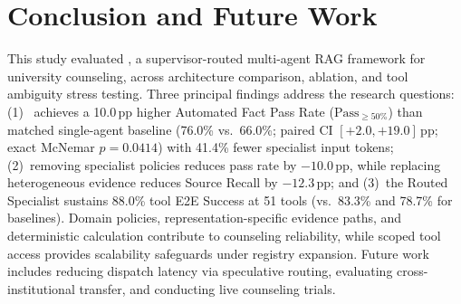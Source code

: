 \section{Conclusion and Future Work}
\label{sec:conclusion}

This study evaluated \system{}, a supervisor-routed multi-agent RAG framework for university counseling, across architecture comparison, ablation, and tool ambiguity stress testing. Three principal findings address the research questions: (1)~\system{} achieves a 10.0\,pp higher Automated Fact Pass Rate ($\text{Pass}_{\ge 50\%}$) than matched single-agent baseline (76.0\% vs.\ 66.0\%; paired CI $[+2.0, +19.0]$\,pp; exact McNemar $p{=}0.0414$) with 41.4\% fewer specialist input tokens; (2)~removing specialist policies reduces pass rate by $-10.0$\,pp, while replacing heterogeneous evidence reduces Source Recall by $-12.3$\,pp; and (3)~the Routed Specialist sustains 88.0\% tool E2E Success at 51 tools (vs.\ 83.3\% and 78.7\% for baselines). Domain policies, representation-specific evidence paths, and deterministic calculation contribute to counseling reliability, while scoped tool access provides scalability safeguards under registry expansion. Future work includes reducing dispatch latency via speculative routing, evaluating cross-institutional transfer, and conducting live counseling trials.

